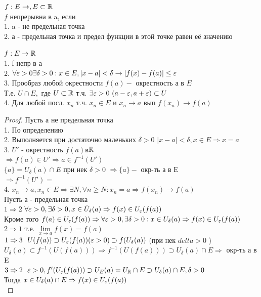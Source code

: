 \begin{definition}
	$ f : E \rightarrow, E \subset \mathbb{R}$\\
	$ f $ непрерывна в a, если \\
	1. a - не предельная точка \\
	2. а - предельная точка и предел функции в этой точке равен её значению 
	
	$ f : E \rightarrow \mathbb{R} $ \\
	1. f непр в а \\
	2. $ \forall \varepsilon > 0 \exists \delta > 0 : x\in E, | x - a | < \delta \rightarrow |f(x) - f(a) | \leq \varepsilon $\\
	3. Прообраз любой окрестности $ f(a) - $ окрестность а в $E$ \\
	Т.е. $ U \cap E, $ где $ U \subset \mathbb{R} $ т.ч. $ \exists \varepsilon > 0 \  (a-\varepsilon, a+\varepsilon) \subset U$\\
	4. Для любой посл. $ x_n $ т.ч. $ x_n \in E $ и $ x_n \rightarrow a $ вып $ f(x_n) \rightarrow f(a) $
	
	\begin{proof}
	Пусть а не предельная точка \\
	1. По определению \\
	2. Выполняется при достаточно маленьких $ \delta  > 0$ $ |x-a| < \delta, x \in E \Rightarrow x = a $ \\
	3. $U'$ - окрестность  $ f(a) $в$ \mathbb{R}$ \\
	$ \Rightarrow f(a) \in U' \Rightarrow a \in f^{-1}( U' ) $ \\
	$ \{a\} = U_{\delta} (a) \cap E $ при нек $ \delta > 0 $ $\Rightarrow \{a\} - $ окр-ть а в Е \\
	$ \Rightarrow  f^{-1}(U') = $\\
	4. $ x_n \rightarrow a, x_n \in E \Rightarrow \exists N, \forall n \geq N : x_n = a \Rightarrow f(x_n) \rightarrow f(a) $ \\ %
	Пусть а - предельная точка \\
	 $ 1 \Rightarrow 2 $ 
	 $ \forall \varepsilon > 0, \exists \delta > 0, x\in \dot{U}_{\delta} (a) \Rightarrow f(x) \in U_{\varepsilon} (f(a)) $ \\
	 Кроме того $ f(a) \in U_{\varepsilon}(f(a)) \Rightarrow \forall \varepsilon > 0, \exists \delta > 0 : x \in U_{\delta} (a) \Rightarrow f(x) \in U_{\varepsilon} (f(a)) $
	 $ 2 \Rightarrow 1 $ т.е. $ \lim\limits_{x \rightarrow a} f(x) = f(a) $\\
	 $ 1 \Rightarrow 3  \ \  U(f(a)) \supset U_{\varepsilon} (f(a)) (\varepsilon > 0) \supset f(U_{\delta}(a)) $ (при нек $delta > 0$ ) \\ %
	 $ U_{\delta}(a) \subset f^{-1} (U(f(a))) \Rightarrow f^{-1} (U(f(a))) \supset U_{\delta} (a) \cap E \Rightarrow $ окр-ть а в E \\
	 $ 3 \Rightarrow 2 \ \ \varepsilon > 0, f'(U_{\varepsilon} (f(a))) \supset U_E(a) =U_{\mathbb{R}}  \cap E \supset U_{\delta} (a) \cap E, \delta > 0 $ \\
	 Тогда $ x \in U_{\delta} (a) \cap E \Rightarrow f(x) \in U_{\varepsilon} (f(a)) $ \\
	 

\end{proof}
\end{definition}
